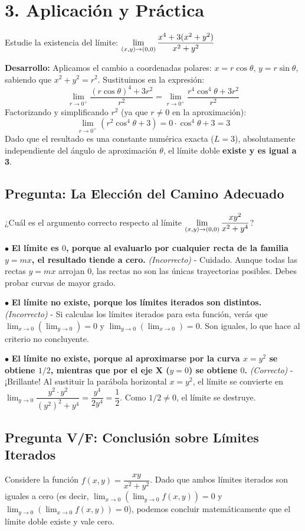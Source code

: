 \documentclass[11pt]{article}
\newenvironment{aplicacion}{%
  \section*{3. Aplicación y Práctica}%
}{}
\newenvironment{ejemplo}[1]{%
  \begin{tcolorbox}[colback=white,colframe=gray!40,title=Ejemplo: #1]%
}{%
  \end{tcolorbox}%
}
\newenvironment{preguntaalternativas}[1]{\subsection*{Pregunta: #1}\par\vspace{0.1cm}}{\vspace{0.3cm}}
\newcommand{\opcion}[3]{\par\noindent $\bullet$ \textbf{#1} \textit{(#2)} - #3\par\vspace{0.15cm}}
\newenvironment{preguntaverdaderofalso}[1]{\subsection*{Pregunta V/F: #1}\par\vspace{0.1cm}}{\vspace{0.3cm}}
\begin{document}
\begin{aplicacion}
  \begin{ejemplo}{Criterio 3: Existencia vía Coordenadas Polares}
    Estudie la existencia del límite: $\displaystyle \displaystyle\lim_{(x,y) \to (0,0)} \dfrac{x^4 + 3(x^2 + y^2)}{x^2 + y^2}$
    
    \textbf{Desarrollo:}
    Aplicamos el cambio a coordenadas polares: $x = r\cos\theta$, $y = r\sin\theta$, sabiendo que $x^2 + y^2 = r^2$.
    Sustituimos en la expresión:
    $$ \displaystyle\lim_{r \to 0^+} \dfrac{(r\cos\theta)^4 + 3r^2}{r^2} = \displaystyle\lim_{r \to 0^+} \dfrac{r^4\cos^4\theta + 3r^2}{r^2} $$
    Factorizando y simplificando $r^2$ (ya que $r \neq 0$ en la aproximación):
    $$ \displaystyle\lim_{r \to 0^+} (r^2\cos^4\theta + 3) = 0 \cdot \cos^4\theta + 3 = 3 $$
    Dado que el resultado es una constante numérica exacta ($L=3$), absolutamente independiente del ángulo de aproximación $\theta$, el límite doble \textbf{existe y es igual a 3}.
  \end{ejemplo}


  \begin{preguntaalternativas}{La Elección del Camino Adecuado}
    ¿Cuál es el argumento correcto respecto al límite $\displaystyle \displaystyle\lim_{(x,y) \to (0,0)} \dfrac{xy^2}{x^2 + y^4}$?
    
    \opcion{El límite es $0$, porque al evaluarlo por cualquier recta de la familia $y = mx$, el resultado tiende a cero.}{Incorrecto}{Cuidado. Aunque todas las rectas $y=mx$ arrojan 0, las rectas no son las únicas trayectorias posibles. Debes probar curvas de mayor grado.}
    \opcion{El límite no existe, porque los límites iterados son distintos.}{Incorrecto}{Si calculas los límites iterados para esta función, verás que $\displaystyle\lim_{x\to 0}(\displaystyle\lim_{y\to 0}) = 0$ y $\displaystyle\lim_{y\to 0}(\displaystyle\lim_{x\to 0}) = 0$. Son iguales, lo que hace al criterio no concluyente.}
    \opcion{El límite no existe, porque al aproximarse por la curva $x = y^2$ se obtiene $1/2$, mientras que por el eje X ($y=0$) se obtiene $0$.}{Correcto}{¡Brillante! Al sustituir la parábola horizontal $x = y^2$, el límite se convierte en $\displaystyle\lim_{y \to 0} \dfrac{y^2 \cdot y^2}{(y^2)^2 + y^4} = \dfrac{y^4}{2y^4} = \dfrac{1}{2}$. Como $1/2 \neq 0$, el límite se destruye.}
  \end{preguntaalternativas}

  \begin{preguntaverdaderofalso}{Conclusión sobre Límites Iterados}
    Considere la función $f(x,y) = \dfrac{xy}{x^2 + y^2}$. Dado que ambos límites iterados son iguales a cero (es decir, $\displaystyle\lim_{x \to 0} (\displaystyle\lim_{y \to 0} f(x,y)) = 0$ y $\displaystyle\lim_{y \to 0} (\displaystyle\lim_{x \to 0} f(x,y)) = 0$), podemos concluir matemáticamente que el límite doble existe y vale cero.
    

\end{preguntaverdaderofalso}
\end{aplicacion}
\end{document}
